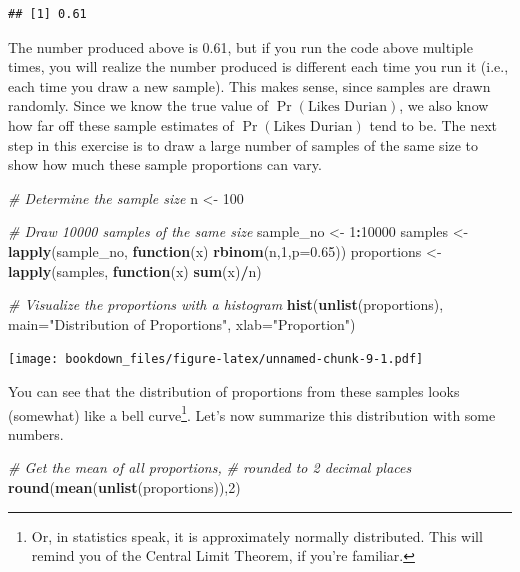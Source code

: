 \documentclass[
  openany]{book}
\newenvironment{Shaded}{\begin{snugshade}}{\end{snugshade}}
\newcommand{\CommentTok}[1]{\textcolor[rgb]{0.56,0.35,0.01}{\textit{#1}}}
\newcommand{\ControlFlowTok}[1]{\textcolor[rgb]{0.13,0.29,0.53}{\textbf{#1}}}
\newcommand{\DataTypeTok}[1]{\textcolor[rgb]{0.13,0.29,0.53}{#1}}
\newcommand{\DecValTok}[1]{\textcolor[rgb]{0.00,0.00,0.81}{#1}}
\newcommand{\FloatTok}[1]{\textcolor[rgb]{0.00,0.00,0.81}{#1}}
\newcommand{\KeywordTok}[1]{\textcolor[rgb]{0.13,0.29,0.53}{\textbf{#1}}}
\newcommand{\NormalTok}[1]{#1}
\newcommand{\OperatorTok}[1]{\textcolor[rgb]{0.81,0.36,0.00}{\textbf{#1}}}
\newcommand{\StringTok}[1]{\textcolor[rgb]{0.31,0.60,0.02}{#1}}
\begin{document}
\begin{verbatim}
## [1] 0.61
\end{verbatim}

The number produced above is 0.61, but if you run the code above multiple times, you will realize the number produced is different each time you run it (i.e., each time you draw a new sample). This makes sense, since samples are drawn randomly. Since we know the true value of \(\Pr(\text{Likes Durian})\), we also know how far off these sample estimates of \(\Pr(\text{Likes Durian})\) tend to be. The next step in this exercise is to draw a large number of samples of the same size to show how much these sample proportions can vary.

\begin{Shaded}
\begin{Highlighting}[]
\CommentTok{# Determine the sample size}
\NormalTok{n <-}\StringTok{ }\DecValTok{100}

\CommentTok{# Draw 10000 samples of the same size}
\NormalTok{sample_no <-}\StringTok{ }\DecValTok{1}\OperatorTok{:}\DecValTok{10000}
\NormalTok{samples <-}\StringTok{ }\KeywordTok{lapply}\NormalTok{(sample_no, }\ControlFlowTok{function}\NormalTok{(x) }\KeywordTok{rbinom}\NormalTok{(n,}\DecValTok{1}\NormalTok{,}\DataTypeTok{p=}\FloatTok{0.65}\NormalTok{))}
\NormalTok{proportions <-}\StringTok{ }\KeywordTok{lapply}\NormalTok{(samples, }\ControlFlowTok{function}\NormalTok{(x) }\KeywordTok{sum}\NormalTok{(x)}\OperatorTok{/}\NormalTok{n)}

\CommentTok{# Visualize the proportions with a histogram}
\KeywordTok{hist}\NormalTok{(}\KeywordTok{unlist}\NormalTok{(proportions), }
     \DataTypeTok{main=}\StringTok{"Distribution of Proportions"}\NormalTok{, }
     \DataTypeTok{xlab=}\StringTok{"Proportion"}\NormalTok{)}
\end{Highlighting}
\end{Shaded}

\texttt{[image: bookdown\_files/figure-latex/unnamed-chunk-9-1.pdf]}

You can see that the distribution of proportions from these samples looks (somewhat) like a bell curve\footnote{Or, in statistics speak, it is approximately normally distributed. This will remind you of the Central Limit Theorem, if you're familiar.}. Let's now summarize this distribution with some numbers.

\begin{Shaded}
\begin{Highlighting}[]
\CommentTok{# Get the mean of all proportions, }
\CommentTok{#  rounded to 2 decimal places}
\KeywordTok{round}\NormalTok{(}\KeywordTok{mean}\NormalTok{(}\KeywordTok{unlist}\NormalTok{(proportions)),}\DecValTok{2}\NormalTok{)}
\end{Highlighting}
\end{Shaded}
\end{document}
